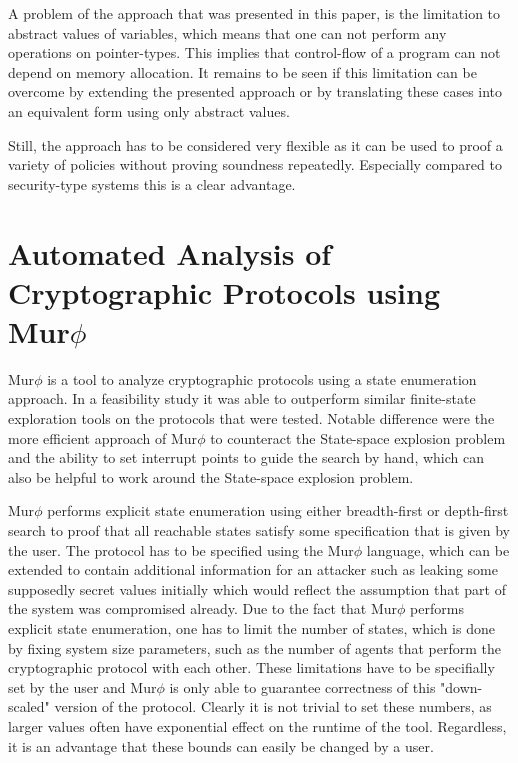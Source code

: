 \documentclass[a4paper,UKenglish]{lipics-v2018}
\def\murphi{Mur$\phi$ }
\begin{document}
A problem of the approach that was presented in this paper, is the limitation to abstract values of variables\cite{information_flow_by_self_composition}, which means that one can not perform any operations on pointer-types. This implies that control-flow of a program can not depend on memory allocation. It remains to be seen if this limitation can be overcome by extending the presented approach or by translating these cases into an equivalent form using only abstract values.

Still, the approach has to be considered very flexible as it can be used to proof a variety of policies without proving soundness repeatedly. Especially compared to security-type systems this is a clear advantage.










\newpage
\section{Automated Analysis of Cryptographic Protocols using \murphi}

\murphi is a tool to analyze cryptographic protocols using a state enumeration approach. In a feasibility study it was able to outperform similar finite-state exploration tools on the protocols that were tested. Notable difference were the more efficient approach of \murphi to counteract the State-space explosion problem and the ability to set interrupt points to guide the search by hand, which can also be helpful to work around the State-space explosion problem.\cite{murphi}

\murphi performs explicit state enumeration using either breadth-first or depth-first search to proof that all reachable states satisfy some specification that is given by the user. The protocol has to be specified using the \murphi language, which can be extended to contain additional information for an attacker such as leaking some supposedly secret values initially which would reflect the assumption that part of the system was compromised already. Due to the fact that \murphi performs explicit state enumeration, one has to limit the number of states, which is done by fixing system size parameters, such as the number of agents that perform the cryptographic protocol with each other. These limitations have to be specifially set by the user and \murphi is only able to guarantee correctness of this "down-scaled" version of the protocol. Clearly it is not trivial to set these numbers, as larger values often have exponential effect on the runtime of the tool.\cite{murphi} Regardless, it is an advantage that these bounds can easily be changed by a user.
\end{document}
